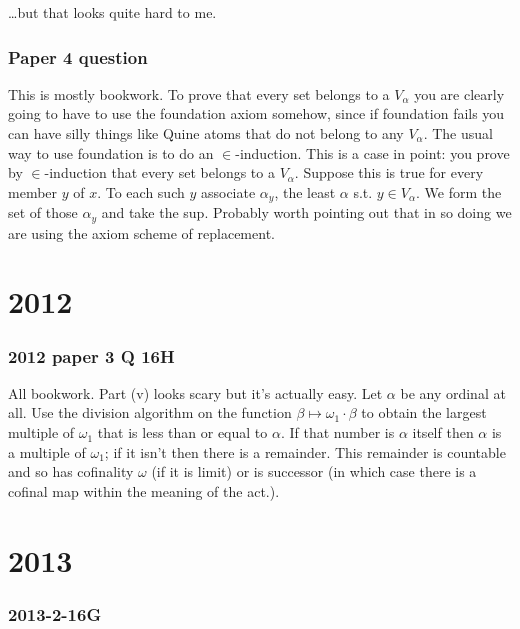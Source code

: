 \documentclass{book}
\begin{document}
\smallskip

\ldots but that looks quite hard to me.

\subsection*{Paper 4 question}

This is mostly bookwork.  To prove that every set belongs to a
$V_\alpha$ you are clearly going to have to use the foundation axiom
somehow, since if foundation fails you can have silly things like
Quine atoms that do not belong to any $V_\alpha$.  The usual way to
use foundation is to do an $\in$-induction.  This is a case in point:
you prove by $\in$-induction that every set belongs to a $V_\alpha$.
Suppose this is true for every member $y$ of $x$.  To each such $y$
associate $\alpha_y$, the least $\alpha$ s.t. $y \in V_\alpha$. We
form the set of those $\alpha_y$ and take the sup.  Probably worth
pointing out that in so doing we are using the axiom scheme of
replacement.

\chapter{2012}
\subsection*{2012 paper 3 Q 16H}

All bookwork.  Part (v) looks scary but it's actually easy.  Let
$\alpha$ be any ordinal at all.  Use the division algorithm on the
function $\beta \mapsto \omega_1\cdot \beta$ to obtain the largest
multiple of $\omega_1$ that is less than or equal to $\alpha$.  If
that number is $\alpha$ itself then $\alpha$ is a multiple of
$\omega_1$; if it isn't then there is a remainder.  This remainder is
countable and so has cofinality $\omega$ (if it is limit) or is
successor (in which case there is a cofinal map within the meaning of
the act.).


\chapter{2013}
\subsection*{2013-2-16G}\label{2013-2-16G}
\end{document}
